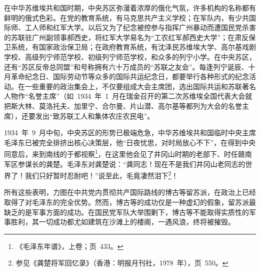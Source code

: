 在中华苏维埃共和国时期，中央苏区弥漫着浓厚的俄化气氛，许多机构的名称都有鲜明的俄式色彩。在党的教育系统，有马克思共产主义学校；在军队内，有少共国际师、工人师和红军大学。以后又为了纪念被控参与指挥广州暴动而遭国民党杀害的苏联驻广州副领事郝西史，将红军大学易名为“工农红军郝西史大学”；在肃反保卫系统，有国家政治保卫局；在政府教育系统，有沈泽民苏维埃大学、高尔基戏剧学校、高级列宁师范学校、初级列宁师范学校，和众多的列宁小学。在中央苏区，还有“苏区反帝总同盟”和号称拥有六十万成员的“苏联之友会”。每逢列宁诞辰、十月革命纪念日、国际劳动节等众多的国际共运纪念日，都要举行各种形式的纪念活动。在一些重要的政治集会上，不仅要组成大会主席团，选出国际共运和苏联著名人物作“名誉主席”（如~1934~年~1~月在瑞金召开的第二次苏维埃全国代表大会就把斯大林、莫洛托夫、加里宁、合尔曼、片山潜、高尔基等都列为大会的名誉主席），还要发出“致苏联工人和集体农庄农民电”。

1934~年~9~月中旬，中央苏区的形势已极端危急，中华苏维埃共和国临时中央主席毛泽东已被完全排挤出核心决策层，他“日夜忧思，对时局放心不下”，在得到中央同意后，来到南线的于都视察\footnote{《毛泽东年谱》，上卷；页~433。}，在这里他会见了井冈山时期的老部下、时任赣南军区参谋长的龚楚。毛泽东对龚楚说：“龚同志！现在不是我们井冈山老同志的世界了！我们只好暂时忍耐吧！”说至此，毛竟凄然泪下\footnote{参见《龚楚将军回忆录》（香港：明报月刊社，1978~年），页~550。}！

所有这些表明，力图在中共党内贯彻共产国际路线的博古等留苏派，在政治上已经取得了对毛泽东的完全优势。然而，博古等的成功仅是一种虚幻的假象，留苏派最缺乏的是军事方面的成功。在国民党军队大举围剿下，博古等不能取得实质性的军事胜利，其一切成功都尤如建筑在沙滩上的楼阁，一遇风浪，终将被摧毁。